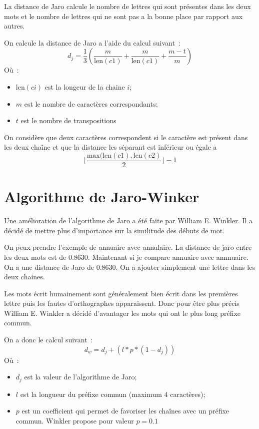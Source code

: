 \documentclass[final, 10pt]{report}
\begin{document}
    La distance de Jaro calcule le nombre de lettres qui sont présentes dans les deux mots et le nombre de lettres qui ne sont pas a la bonne place par rapport aux autres.
    
    
    On calcule la distance de Jaro a l'aide du calcul suivant~: 
    $$d_j = \frac{1}{3}\left(\frac{m}{\text{len}(c1)}+\frac{m}{\text{len}(c1)}+\frac{m-t}{m}\right)$$
    Où~:
    \begin{itemize}
        \item $\text{len}(ci)$ est la longeur de la chaine $i$;
        \item $m$ est le nombre de caractères correspondants;
        \item $t$ est le nombre de transpositions
    \end{itemize}

    \medskip
    On considère que deux caractères correspondent si le caractère est présent dans les deux chaîne et que la distance les séparant est inférieur ou égale a $$\lfloor\frac{\text{max}(\text{len}(c1), \text{len}(c2)}{2}\rfloor -1$$
    
\section{Algorithme de Jaro-Winker\cite{noauthor_distance_2021}}

    Une amélioration de l'algorithme de Jaro a été faite par William E. Winkler.
    Il a décidé de mettre plus d'importance sur la similitude des débuts de mot.
    
    On peux prendre l'exemple de \fg annuaire\og{} avec \fg annulaire\og{}. 
    La distance de jaro entre les deux mots est de $0.8630$.
    Maintenant si je compare  \fg annuaire\og{} avec \fg annnuaire\og{}.
    On a une distance de Jaro de $0.8630$.
    On a ajouter simplement une lettre dans les deux chaines.
    
    Les mots écrit humainement sont généralement bien écrit dans les premières lettre puis les fautes d'orthographes apparaissent.
    Donc pour être plus précis William E. Winkler a décidé d'avantager les mots qui ont le plus long préfixe commun.
    
    
    On a donc le calcul suivant~:
    $$ d_w = d_j +(l * p * (1-d_j) )$$
    Où~:
    \begin{itemize}
        \item $d_j$ est la valeur de l'algorithme de Jaro;
        \item $l$ est la longueur du préfixe commun (maximum 4 caractères);
        \item $p$ est un coefficient qui permet de favoriser les chaînes avec un préfixe commun.
        Winkler propose pour valeur $p=0.1$
    \end{itemize}
    
\end{document}

